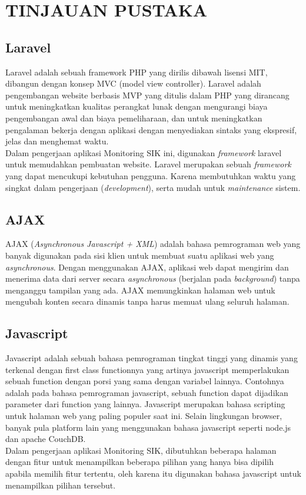 \chapter{TINJAUAN PUSTAKA}

\section{Laravel}
\tab Laravel adalah sebuah framework PHP yang dirilis dibawah lisensi MIT, dibangun dengan konsep MVC (model view controller). Laravel adalah pengembangan website berbasis MVP yang ditulis dalam PHP yang dirancang untuk meningkatkan kualitas perangkat lunak dengan mengurangi biaya pengembangan awal dan biaya pemeliharaan, dan untuk meningkatkan pengalaman bekerja dengan aplikasi dengan menyediakan sintaks yang ekspresif, jelas dan menghemat waktu\cite{laravel}.\\
\tab Dalam pengerjaan aplikasi Monitoring SIK ini, digunakan \textit{framework} laravel untuk memudahkan pembuatan website. Laravel merupakan sebuah \textit{framework} yang dapat mencukupi kebutuhan pengguna. Karena membutuhkan waktu yang singkat dalam pengerjaan (\textit{development}), serta mudah untuk \textit{maintenance} sistem.

\section{AJAX}
\tab AJAX (\textit{Asynchronous Javascript + XML}) adalah bahasa pemrograman web yang banyak digunakan pada sisi klien untuk membuat suatu aplikasi web yang \textit{asynchronous}. Dengan menggunakan AJAX, aplikasi web dapat mengirim dan menerima data dari server secara \textit{asynchronous} (berjalan pada \textit{background}) tanpa menganggu tampilan yang ada. AJAX memungkinkan halaman web untuk mengubah konten secara dinamis tanpa harus memuat ulang seluruh halaman. \cite{ajax} \\

\section{Javascript}
\tab Javascript adalah sebuah bahasa pemrograman tingkat tinggi yang dinamis yang terkenal dengan first class functionnya yang artinya javascript memperlakukan sebuah function dengan porsi yang sama dengan variabel lainnya. Contohnya adalah pada bahasa pemrograman javascript, sebuah function dapat dijadikan parameter dari function yang lainnya. Javascript merupakan bahasa scripting untuk halaman web yang paling populer saat ini. Selain lingkungan browser, banyak pula platform lain yang menggunakan bahasa javascript seperti node.js dan apache CouchDB\cite{javascript}.\\
\tab Dalam pengerjaan aplikasi Monitoring SIK, dibutuhkan beberapa halaman dengan fitur untuk menampilkan beberapa pilihan yang hanya bisa dipilih apabila memilih fitur tertentu, oleh karena itu digunakan bahasa javascript untuk menampilkan pilihan tersebut.

